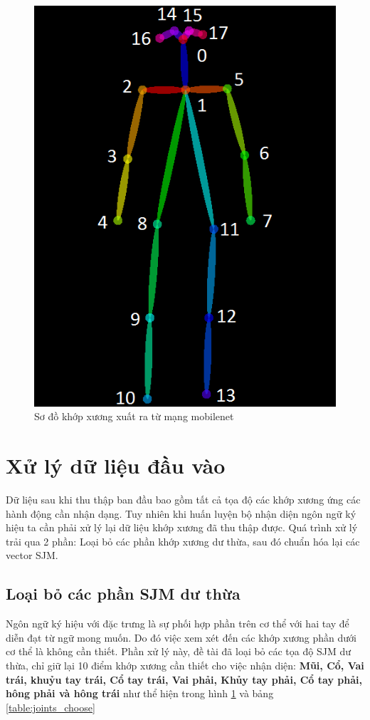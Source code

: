 \FloatBarrier
\begin{figure}[htp]
\begin{center}
\includegraphics[scale=0.6]{chap4/c4_figs/joints_order.png}
\end{center}
\caption{Sơ đồ khớp xương xuất ra từ mạng mobilenet}
\label{fig:joints}
\end{figure}
\FloatBarrier

\section{Xử lý dữ liệu đầu vào}
Dữ liệu sau khi thu thập ban đầu bao gồm tất cả tọa độ các khớp xương ứng các hành động cần nhận dạng. Tuy nhiên khi huấn luyện bộ nhận diện ngôn ngữ ký hiệu ta cần phải xử lý lại dữ liệu khớp xương đã thu thập được. Quá trình xử lý trải qua 2 phần: Loại bỏ các phần khớp xương dư thừa, sau đó chuẩn hóa lại các vector SJM.

\subsection{Loại bỏ các phần SJM dư thừa}
Ngôn ngữ ký hiệu với đặc trưng là sự phối hợp phần trên cơ thể với hai tay để diễn đạt từ ngữ mong muốn. Do đó việc xem xét đến các khớp xương phần dưới cơ thể là không cần thiết. Phần xử lý này, đề tài đã loại bỏ các tọa độ SJM dư thừa, chỉ giữ lại 10 điểm khớp xương cần thiết cho việc nhận diện: \textbf{Mũi, Cổ, Vai trái, khuỷu tay trái, Cổ tay trái, Vai phải, Khủy tay phải, Cổ tay phải, hông phải và hông trái} như thể hiện trong hình \ref{fig:joints} và bảng \ref{table:joints_choose}

